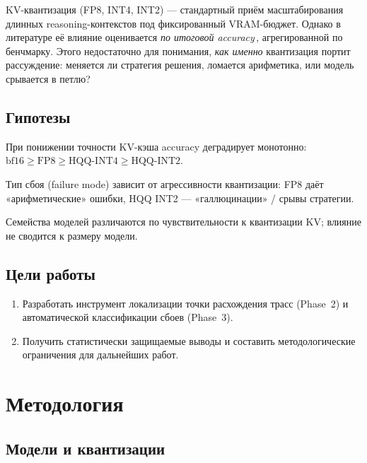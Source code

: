 \documentclass[11pt, a4paper]{article}
\begin{document}
KV-квантизация (FP8, INT4, INT2) — стандартный приём масштабирования
длинных reasoning-контекстов под фиксированный VRAM-бюджет. Однако в
литературе её влияние оценивается \emph{по итоговой accuracy}\,,
агрегированной по бенчмарку. Этого недостаточно для понимания, \emph{как
именно} квантизация портит рассуждение: меняется ли стратегия решения,
ломается арифметика, или модель срывается в петлю?

\subsection{Гипотезы}

\begin{description}[leftmargin=2.6em, style=nextline]
\item[\textbf{H1 (количественная)}] При понижении точности KV-кэша
    accuracy деградирует монотонно:
    $\mathrm{bf16} \geq \mathrm{FP8} \geq \mathrm{HQQ\text{-}INT4} \geq
    \mathrm{HQQ\text{-}INT2}$.
\item[\textbf{H2 (качественная)}] Тип сбоя (failure mode) зависит от
    агрессивности квантизации: FP8 даёт «арифметические» ошибки,
    HQQ INT2 — «галлюцинации» / срывы стратегии.
\item[\textbf{H3 (архитектурная)}] Семейства моделей различаются
    по чувствительности к квантизации KV; влияние не сводится к
    размеру модели.
\end{description}

\subsection{Цели работы}

\begin{enumerate}[leftmargin=*]
\item Разработать инструмент локализации точки расхождения трасс
(Phase~2) и автоматической классификации сбоев (Phase~3).
\item Получить статистически защищаемые выводы и составить
методологические ограничения для дальнейших работ.
\end{enumerate}

\section{Методология}

\subsection{Модели и квантизации}
\end{document}
